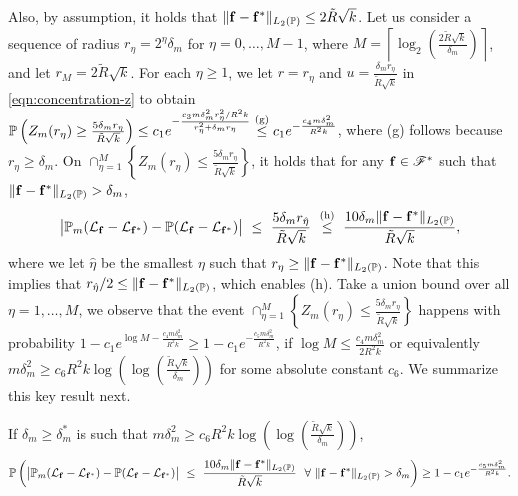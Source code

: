 {     Also, by assumption, it holds that $\lVert \mathbf{f} - \mathbf{f}^*\rVert_{L_2(\mathbb{P})} \leq 2\tilde{R}\sqrt{k}$. 
    Let us consider a sequence of radius $r_\eta = 2^{\eta} \delta_m$ for $\eta = 0, \dots, M-1$, where $M = \left\lceil \log_2\left(\frac{2\tilde{R}\sqrt{k}}{\delta_m}\right) \right \rceil$, and let $r_M = 2\tilde{R}\sqrt{k}$. 
    For each $\eta \geq 1$, we let  $r = r_\eta$ and $u = \frac{\delta_m r_\eta}{\tilde{R}\sqrt{k}}$ in \eqref{eqn:concentration-z} to obtain $\mathbb{P}\left(Z_m(r_\eta) \geq \frac{5\delta_m r_{\eta}}{\tilde{R}\sqrt{k}}\right) \leq c_1 e^{-\frac{c_3 m \delta^2_m r^2_\eta/R^2 k}{r^2_\eta + \delta_m r_\eta}} \stackrel{\text{(g)}}{\leq} c_1 e^{-\frac{c_4 m \delta^2_m}{R^2k}}$, where (g) follows because $r_\eta \geq \delta_m$. 
    On $\cap_{\eta = 1}^M\left\{Z_m(r_\eta) \leq \frac{5\delta_m r_{\eta}}{\tilde{R}\sqrt{k}}\right\}$, it holds that for any $\mathbf{f} \in \mathscr{F}^*$ such that $\lVert \mathbf{f} - \mathbf{f}^*\rVert_{L_2(\mathbb{P})} > \delta_m$, 
    $$
    \big|
    \mathbb{P}_m(\mathcal{L}_{\mathbf{f}} - \mathcal{L}_{\mathbf{f}^*} ) - \mathbb{P}(\mathcal{L}_{\mathbf{f}} - \mathcal{L}_{\mathbf{f}^*} ) 
    \big|~\leq~ \frac{5\delta_m r_{\hat{\eta}}}{\tilde{R}\sqrt{k}} ~\stackrel{\text{(h)}}{\leq}~ \frac{10\delta_m\lVert \mathbf{f} - \mathbf{f}^*\rVert_{L_2(\mathbb{P})}  }{\tilde{R}\sqrt{k}}, 
    $$
    where we let $\hat{\eta}$ be the smallest $\eta$ such that $r_{\eta} \geq \lVert \mathbf{f} - \mathbf{f}^*\rVert_{L_2(\mathbb{P})} $. 
    Note that this implies that $r_{\hat{\eta}}/2 \leq \lVert \mathbf{f} - \mathbf{f}^*\rVert_{L_2(\mathbb{P})}$, which enables (h). 
    Take a union bound over all $\eta = 1, \dots, M$, we observe that the event $\cap_{\eta = 1}^M\left\{Z_m(r_\eta) \leq \frac{5\delta_m r_{\eta}}{\tilde{R}\sqrt{k}}\right\}$ happens with probability 
    $1 - c_1e^{\log M -\frac{c_4 m \delta^2_m}{R^2k}} \geq 
    1 - c_1e^{-\frac{c_5 m \delta^2_m}{R^2k}}$, if $\log M \leq \frac{c_4 m \delta^2_m}{2R^2k}$ or equivalently 
    $m \delta^2_m \geq c_6 R^2k\log\left(\log\left(\frac{\tilde{R}\sqrt{k}}{\delta_m}\right)\right)$ for some absolute constant $c_6$.
    We summarize this key result next.
    
    \begin{lem} 
    \label{lem:uniform}
    If $\delta_m \geq \delta_m^*$ is such that $m \delta^2_m \geq c_6 R^2k\log\left(\log\left(\frac{\tilde{R}\sqrt{k}}{\delta_m}\right)\right)$, 
    $$
        \mathbb{P}\left(
          \big|
    \mathbb{P}_m(\mathcal{L}_{\mathbf{f}} - \mathcal{L}_{\mathbf{f}^*} ) - \mathbb{P}(\mathcal{L}_{\mathbf{f}} - \mathcal{L}_{\mathbf{f}^*} ) 
    \big|~\leq~  \frac{10\delta_m\lVert \mathbf{f} - \mathbf{f}^*\rVert_{L_2(\mathbb{P})}  }{\tilde{R}\sqrt{k}}~~\forall~\lVert \mathbf{f} - \mathbf{f}^*\rVert_{L_2(\mathbb{P})} > \delta_m 
        \right) \geq 1 - c_1e^{-\frac{c_5 m \delta^2_m}{R^2k}}.$$
    \end{lem}

}
